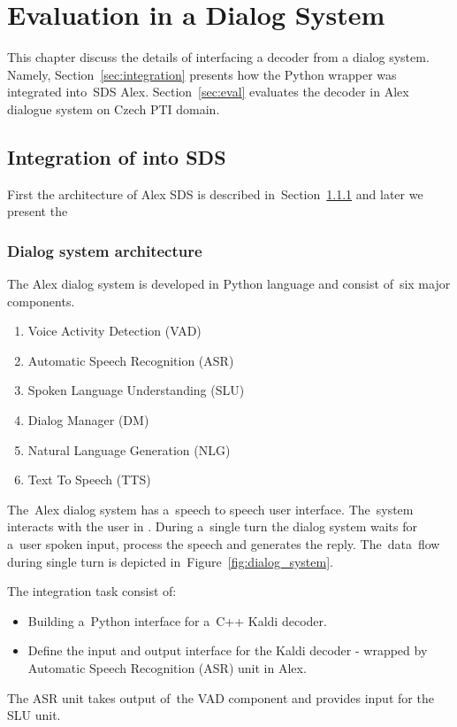 \chapter{Evaluation in a Dialog System}
\label{cha:integration}
This chapter discuss the details of interfacing a decoder from a dialog system.
Namely, Section~\ref{sec:integration} presents how the Python wrapper  was integrated 
into~\ac{SDS} Alex.
Section~\ref{sec:eval} evaluates the decoder in Alex dialogue system on Czech \ac{PTI} domain. 


\section{Integration of  into \ac{SDS}}
\label{sec:}
First the architecture of Alex \ac{SDS} is described in~Section~\ref{sec:arch}
and later we present the 

\subsection{Dialog system architecture} 
\label{sec:arch}
The Alex dialog system is developed in Python language and consist of~six major components. 
\begin{enumerate}
    \item Voice Activity Detection (VAD)
    \item Automatic Speech Recognition (ASR) 
    \item Spoken Language Understanding (SLU)
    \item Dialog Manager (DM)
    \item Natural Language Generation (NLG)
    \item Text To Speech (TTS)
\end{enumerate}
The~Alex dialog system has a~speech to speech user interface. The~system interacts with the user in . During a~single turn the dialog system waits for a~user spoken input, process the speech and generates the reply.
The~data~flow during single turn is depicted in~Figure~\ref{fig:dialog_system}.

The integration task consist of:
\begin{itemize}
    \item Building a~Python interface for a~C++ Kaldi decoder.
    \item Define the input and output interface for the Kaldi decoder - wrapped by Automatic Speech Recognition (ASR) unit in Alex.
\end{itemize}
 The ASR unit takes output of~the VAD component and provides input for the SLU unit. 

